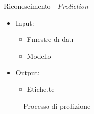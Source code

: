 \begin{tframe}{Riconoscimento - \textit{Prediction}}

    \begin{minipage}{0.45\textwidth}
        
        \begin{itemize}
            \item Input:
                \begin{itemize}
                    \item Finestre di dati
                    \item Modello 
                \end{itemize}
        \end{itemize}

    \end{minipage}%
    \hfill
    \begin{minipage}{0.55\textwidth}
        
        \begin{itemize}
            \item Output:
                \begin{itemize}
                    \item Etichette
                \end{itemize}
        \end{itemize}
        \vspace{3mm}
        
    \end{minipage}%

    \vspace{5mm}

    \begin{figure}
        
        \caption*{Processo di predizione}
    \end{figure}

\end{tframe}